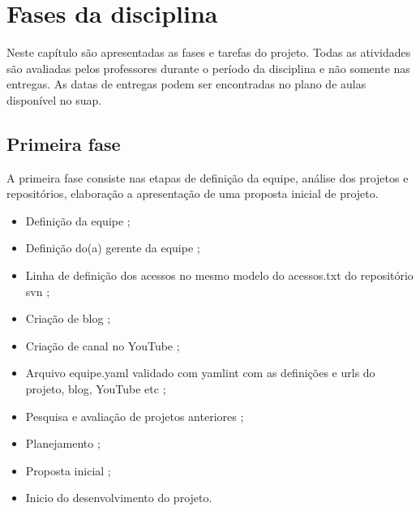 \chapter{Fases da disciplina}
\label{fases-da-disciplina}
Neste capítulo são apresentadas as fases e tarefas do projeto. Todas as atividades são avaliadas pelos professores durante o período da disciplina e não somente nas entregas. 
As datas de entregas podem ser encontradas no plano de aulas disponível no \ac{suap}.



\section{Primeira fase}
A primeira fase consiste nas etapas de definição da equipe, análise dos projetos e repositórios, elaboração a apresentação de uma proposta inicial de projeto. 

\begin{itemize}
    \item Definição da equipe ;
    
    \item Definição do(a) gerente da equipe ;
    
    \item Linha de definição dos acessos no mesmo modelo do acessos.txt do repositório \gls{svn} ;
    
    \item Criação de blog ;
    
    \item Criação de canal no YouTube ;
    
    \item Arquivo equipe.yaml validado com yamlint com as definições e urls do projeto, blog, YouTube etc ;
    
    \item Pesquisa e avaliação de projetos anteriores ;
    
    \item Planejamento ;
    
    \item Proposta inicial ;
    
    \item Inicio do desenvolvimento do projeto.
\end{itemize}


